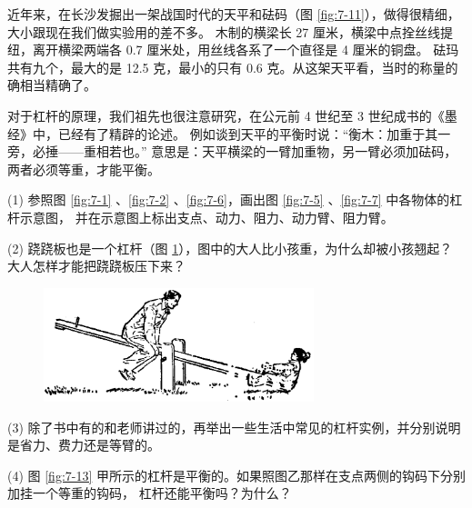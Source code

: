 近年来，在长沙发掘出一架战国时代的天平和砝码（图 \ref{fig:7-11}），做得很精细，大小跟现在我们做实验用的差不多。
木制的横梁长 27 厘米，横梁中点拴丝线提纽，离开横梁两端各 0.7 厘米处，用丝线各系了一个直径是 4 厘米的铜盘。
砝玛共有九个，最大的是 12.5 克，最小的只有 0.6 克。从这架天平看，当时的称量的确相当精确了。

对于杠杆的原理，我们祖先也很注意研究，在公元前 4 世纪至 3 世纪成书的《墨经》中，已经有了精辟的论述。
例如谈到天平的平衡时说：“衡木：加重于其一旁，必捶——重相若也。”
意思是：天平横梁的一臂加重物，另一臂必须加砝码，两者必须等重，才能平衡。



\lianxi

(1) 参照图 \ref{fig:7-1} 、\ref{fig:7-2} 、\ref{fig:7-6}，画出图 \ref{fig:7-5} 、\ref{fig:7-7} 中各物体的杠杆示意图，
并在示意图上标出支点、动力、阻力、动力臂、阻力臂。

(2) 跷跷板也是一个杠杆（图 \ref{fig:7-12}），图中的大人比小孩重，为什么却被小孩翘起？
大人怎样才能把跷跷板压下来？

\begin{figure}[htbp]
    \centering
    \includegraphics[width=0.7\textwidth]{../pic/czwl1-ch7-12}
    \caption{}\label{fig:7-12}
\end{figure}


(3) 除了书中有的和老师讲过的，再举出一些生活中常见的杠杆实例，并分别说明是省力、费力还是等臂的。

(4) 图 \ref{fig:7-13} 甲所示的杠杆是平衡的。如果照图乙那样在支点两侧的钩码下分别加挂一个等重的钩码，
杠杆还能平衡吗？为什么？

